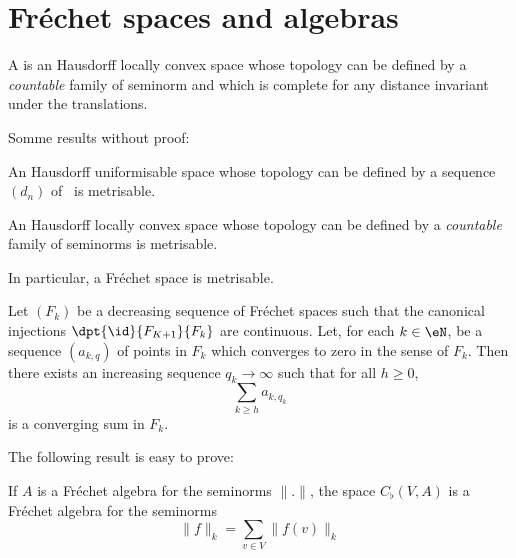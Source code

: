 
\section{Fréchet spaces and algebras}

\begin{definition}
	A  is an Hausdorff locally convex space whose topology can be defined by a \emph{countable} family of seminorm and which is complete for any distance invariant under the translations.
\end{definition}

Somme results without proof:
\begin{lemma}
	An Hausdorff uniformisable space whose topology can be defined by a sequence $(d_n)$ of \ecarts\ is metrisable.
\end{lemma}

\begin{lemma}
	An Hausdorff locally convex space whose topology can be defined by a \emph{countable} family of seminorms is metrisable.
\end{lemma}

In particular, a Fréchet space is metrisable.

\begin{lemma} \label{prop_suiteFk}
	Let $(F_k)$ be a decreasing sequence of Fréchet spaces such that the canonical injections $\dpt{\id}{F_{K+1}}{F_k}$ are continuous. Let, for each $k\in\eN$, be a sequence $(a_{k,q})$ of points in $F_k$ which converges to zero in the sense of $F_k$. Then there exists an increasing sequence $q_k\to\infty$ such that for all $h\geq 0$,
	\[
		\sum_{k\geq h}a_{k,q_k}
	\]
	is a converging sum in $F_k$.
\end{lemma}

The following result is easy to prove:

\begin{proposition}
	If $A$ is a Fréchet algebra for the seminorms $\| . \|$, the space $C_{\flat}(V,A)$ is a Fréchet algebra for the seminorms
	\[
		\| f \|_k=\sum_{v\in V}\| f(v) \|_k
	\]
\end{proposition}


